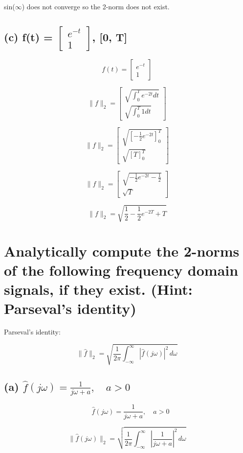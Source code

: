 \documentclass[12pt, letterpaper]{article}
\begin{document}
sin($\infty$) does not converge so the 2-norm does not exist.

\subsection*{(c) f(t) = $\begin{bmatrix} e^{-t} \\ 1 \end{bmatrix}$, [0, T]}

\[ f(t) = \begin{bmatrix} e^{-t} \\ 1 \end{bmatrix} \]

\[ \|f\|_2 = \begin{bmatrix} \sqrt{\int_0^T e^{-2t} dt} \\ \sqrt{\int_0^T 1 dt} \end{bmatrix} \]

\[ \|f\|_2 = \begin{bmatrix} \sqrt{\left[ -\frac{1}{2}e^{-2t} \right]_{0}^{T}} \\ \sqrt{\left[ T \right]_{0}^{T}} \end{bmatrix} \]

\[ \|f\|_2 = \begin{bmatrix} \sqrt{-\frac{1}{2}e^{-2t}  - \frac{1}{2}} \\ \sqrt{T} \end{bmatrix} \]

\[ \|f\|_2 = \sqrt{\frac{1}{2} - \frac{1}{2} e^{-2T} + T} \]


\section{Analytically compute the 2-norms of the following frequency domain signals, if they exist.
(Hint: Parseval’s identity)}

Parseval's identity:

\[\|\hat{f}\|_2 = \sqrt{\frac{1}{2\pi} \int_{-\infty}^\infty \left| \hat{f}(j\omega) \right|^2 \, d\omega} \]

\subsection*{(a) $\hat{f}(j\omega) = \frac{1}{j\omega + a}, \quad a > 0$}

\[ \quad \hat{f}(j\omega) = \frac{1}{j\omega + a}, \quad a > 0 \]

\[\|\hat{f}(j\omega)\|_2 = \sqrt{\frac{1}{2\pi} \int_{-\infty}^\infty \left| \frac{1}{j\omega + a} \right|^2 \, d\omega} \]
\end{document}
